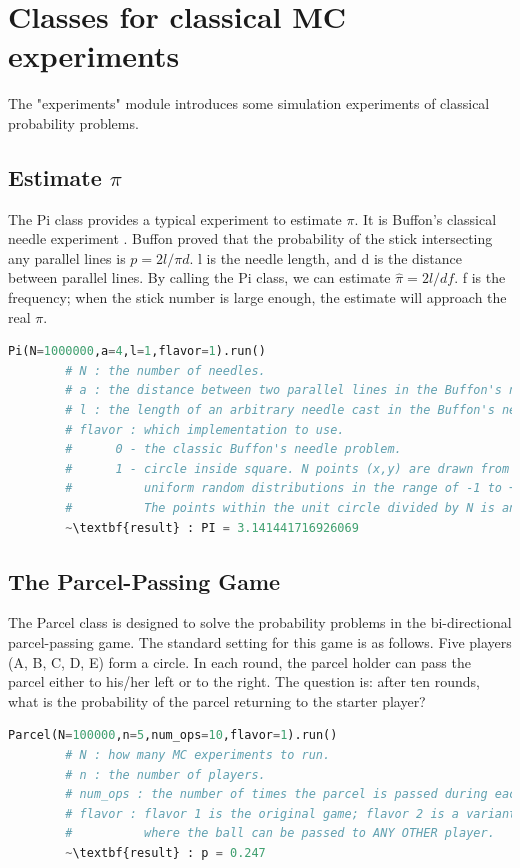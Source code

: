 \documentclass[11pt, letterpaper]{article}
\begin{document}
\section{Classes for classical MC experiments}
The "experiments" module introduces some simulation experiments of classical probability problems.
\subsection{Estimate $\pi$}
The Pi class provides a typical experiment to estimate $\pi$. It is Buffon's classical needle experiment \cite{bib11}.
Buffon proved that the probability of the stick intersecting any parallel lines is $p=2l/\pi d$.
l is the needle length, and d is the distance between parallel lines.
By calling the Pi class, we can estimate $\hat{\pi}=2l/df$. f is the frequency; when the stick
number is large enough, the estimate will approach the real $\pi$.

\lstset{
    basicstyle=\footnotesize,
    xleftmargin=-3em, aboveskip=0.5em,belowskip=0.5em,
    escapeinside=~~,
}
\begin{lstlisting}[language=python]
        Pi(N=1000000,a=4,l=1,flavor=1).run()
        # N : the number of needles.
        # a : the distance between two parallel lines in the Buffon's needle problem.
        # l : the length of an arbitrary needle cast in the Buffon's needle problem. 
        # flavor : which implementation to use.
        #      0 - the classic Buffon's needle problem.
        #      1 - circle inside square. N points (x,y) are drawn from 
        #          uniform random distributions in the range of -1 to +1.
        #          The points within the unit circle divided by N is an approximation of PI/4. 
        ~\textbf{result} : PI = 3.141441716926069
    \end{lstlisting}

\subsection{The Parcel-Passing Game}
The Parcel class is designed to solve the probability problems in the bi-directional parcel-passing game.
The standard setting for this game is as follows. Five players (A, B, C, D, E) form a circle. In each round,
the parcel holder can pass the parcel either to his/her left or to the right. The question is: after ten rounds,
what is the probability of the parcel returning to the starter player?

\lstset{
    basicstyle=\footnotesize,
    xleftmargin=-3em, aboveskip=0.5em,belowskip=0.5em,
    escapeinside=~~,
}
\begin{lstlisting}[language=python]
        Parcel(N=100000,n=5,num_ops=10,flavor=1).run()
        # N : how many MC experiments to run.
        # n : the number of players.
        # num_ops : the number of times the parcel is passed during each experiment. 
        # flavor : flavor 1 is the original game; flavor 2 is a variant 
        #          where the ball can be passed to ANY OTHER player.  
        ~\textbf{result} : p = 0.247 
    \end{lstlisting}
\end{document}
